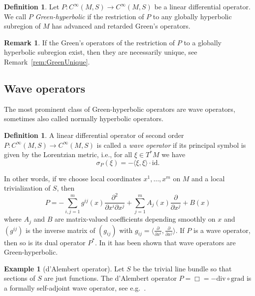 \documentclass[a4paper,11pt]{amsart}
\theoremstyle{definition}
\newtheorem{ex}[thm]{Example}
\newtheorem{rem}[thm]{Remark}
\newtheorem{definition}[thm]{Definition}
\begin{document}
\begin{definition}\label{def-Greenhyperbolic}
Let $P:{C^\infty}(M,S) \to {C^\infty}(M,S)$ be a linear differential operator.
We call $P$ \emph{Green-hyperbolic} if the restriction of $P$ to any globally hyperbolic subregion of $M$ has advanced and retarded Green's operators.\end{definition}

\begin{rem}\label{rem:GreenUnique1}
If the Green's operators of the restriction of $P$ to a globally hyperbolic subregion exist, then they are necessarily unique, see Remark~\ref{rem:GreenUnique}.
\end{rem}

\subsection{Wave operators}
The most prominent class of Green-hyperbolic operators are wave operators, sometimes also called normally hyperbolic operators.

\begin{definition}
A linear differential operator of second order $P:{C^\infty}(M,S) \to {C^\infty}(M,S)$ is called a \emph{wave operator} if its principal symbol is given by the Lorentzian metric, i.e., for all $\xi\in T^*M$ we have
$$
\sigma_P(\xi) = -{\langle}\xi,\xi{\rangle}\cdot{\mathrm{id}} .
$$
\end{definition}

In other words, if we choose local coordinates $x^1,\ldots,x^m$ on $M$ and a
local trivialization of $S$, then 
$$
P = -\sum_{i,j=1}^m g^{ij}(x)\frac{\partial^2}{\partial x^i \partial x^j}
+ \sum_{j=1}^m A_j(x) \frac{\partial}{\partial x^j} + B(x)
$$
where $A_j$ and $B$ are matrix-valued coefficients depending smoothly on
$x$ and $(g^{ij})$ is the inverse matrix of  $(g_{ij})$ with
$g_{ij}={\langle}\frac{\partial}{\partial x^i},\frac{\partial}{\partial x^j}{\rangle}$.
If $P$ is a wave operator, then so is its dual operator $P^*$.
In \cite[Cor.~3.4.3]{BGP} it has been shown that wave operators are Green-hyperbolic.

\begin{ex}[d'Alembert operator]\label{ex:dAlembert}
Let $S$ be the trivial line bundle so that sections of $S$ are just functions.
The d'Alembert operator $P=\Box=-{\mathrm{div}}\circ{\mathrm{grad}}$ is a formally self-adjoint wave operator, see e.g.\ \cite[p.~26]{BGP}.
\end{ex}
\end{document}

